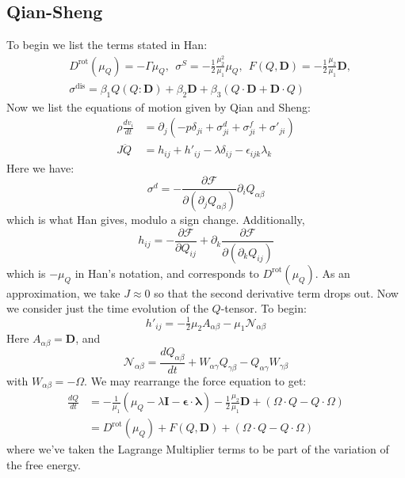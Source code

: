 \documentclass[reqno]{article}
\newcommand\rot{\text{rot}}
\newcommand\dis{\text{dis}}
\begin{document}
\subsection{Qian-Sheng}
To begin we list the terms stated in Han:
\begin{equation*}
\begin{split}
  &D^\rot(\mu_Q) = -\Gamma \mu_Q,
  \:\:
  \sigma^S = -\frac12 \frac{\mu_2^2}{\mu_1} \mu_Q,
  \:\:
  F(Q, \mathbf{D}) = -\frac12 \frac{\mu_2}{\mu_1} \mathbf{D}, \\
  &\sigma^\dis = \beta_1 Q (Q : \mathbf{D})
  + \beta_2 \mathbf{D}
  + \beta_3 (Q\cdot \mathbf{D} + \mathbf{D} \cdot Q)
\end{split}
\end{equation*}
Now we list the equations of motion given by Qian and Sheng:
\begin{align}
  \rho \frac{d v_i}{dt}
  &= \partial_j (-p \delta_{ji} + \sigma^d_{ji} + \sigma^f_{ji} + \sigma'_{ji}) \\
  J \ddot{Q}
  &= h_{ij} + h'_{ij} - \lambda \delta_{ij} - \epsilon_{ijk} \lambda_k
\end{align}
Here we have:
\begin{equation}
  \sigma^d = - \frac{\partial \mathcal{F}}{\partial (\partial_j Q_{\alpha \beta})} \partial_i Q_{\alpha \beta}
\end{equation}
which is what Han gives, modulo a sign change.
Additionally,
\begin{equation}
  h_{ij}
  = - \frac{\partial \mathcal{F}}{\partial Q_{ij}} + \partial_k \frac{\partial \mathcal{F}}{\partial(\partial_k Q_{ij})}
\end{equation}
which is $-\mu_Q$ in Han's notation, and corresponds to $D^\rot(\mu_Q)$.
As an approximation, we take $J \approx 0$ so that the second derivative term
drops out.
Now we consider just the time evolution of the $Q$-tensor.
To begin:
\begin{equation}
  h'_{ij}
  = -\tfrac12 \mu_2 A_{\alpha \beta} - \mu_1 \mathcal{N}_{\alpha \beta}
\end{equation}
Here $A_{\alpha \beta} = \mathbf{D}$, and
\begin{equation}
  \mathcal{N}_{\alpha \beta}
  = \frac{d Q_{\alpha \beta}}{dt}
  + W_{\alpha \gamma} Q_{\gamma \beta}
  - Q_{\alpha \gamma} W_{\gamma \beta}
\end{equation}
with $W_{\alpha \beta} = -\Omega$.
We may rearrange the force equation to get:
\begin{equation}
\begin{split}
  \frac{d Q}{dt}
  &= - \frac{1}{\mu_1} \left( \mu_Q - \lambda \mathbf{I} - \mathbf{\epsilon} \cdot \mathbf{\lambda} \right) 
  -\frac12 \frac{\mu_2}{\mu_1} \mathbf{D}
  + \left( \Omega \cdot Q - Q \cdot \Omega \right) \\
  &= D^\rot(\mu_Q) + F(Q, \mathbf{D})+ \left( \Omega \cdot Q - Q \cdot \Omega \right)
\end{split}
\end{equation}
where we've taken the Lagrange Multiplier terms to be part of the variation of
the free energy.
\end{document}
